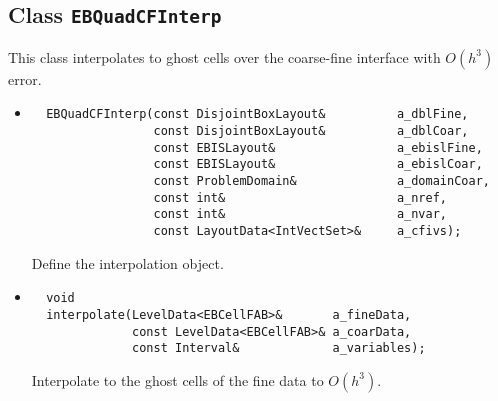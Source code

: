 \subsection{Class {\tt EBQuadCFInterp} }
This class interpolates to ghost cells over the coarse-fine interface
with $O(h^3)$ error.
\begin{itemize}
\item \begin{verbatim}
  EBQuadCFInterp(const DisjointBoxLayout&          a_dblFine,
                 const DisjointBoxLayout&          a_dblCoar,
                 const EBISLayout&                 a_ebislFine,
                 const EBISLayout&                 a_ebislCoar,
                 const ProblemDomain&              a_domainCoar,
                 const int&                        a_nref,
                 const int&                        a_nvar,
                 const LayoutData<IntVectSet>&     a_cfivs);
\end{verbatim}
Define the interpolation object.  


\item \begin{verbatim}
  void
  interpolate(LevelData<EBCellFAB>&       a_fineData,
              const LevelData<EBCellFAB>& a_coarData,
              const Interval&             a_variables);
\end{verbatim}
Interpolate to the ghost cells of the fine data to $O(h^3)$.
\end{itemize}

